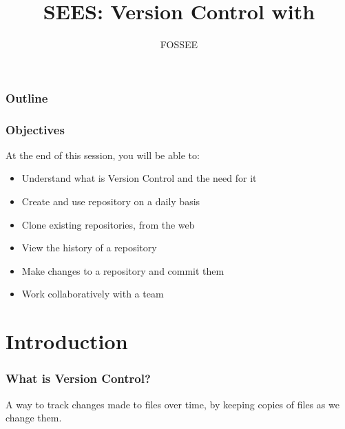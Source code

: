 \documentclass[14pt,compress]{beamer}
\title[Mercurial]{SEES: Version Control with \typ{hg}}
\author[FOSSEE] {FOSSEE}
\institute[IIT Bombay] {Department of Aerospace Engineering\\IIT Bombay}
\date[]{}
\newcounter{time}
\begin{document}
\begin{frame}
  \maketitle
\end{frame}

\begin{frame}
  \frametitle{Outline}
  \tableofcontents
\end{frame}

\begin{frame}
  \frametitle{Objectives}
  At the end of this session, you will be able to:
  \begin{itemize}
  \item Understand what is Version Control and the need for it
  \item Create and use repository on a daily basis
  \item Clone existing repositories, from the web
  \item View the history of a repository 
  \item Make changes to a repository and commit them
  \item Work collaboratively with a team 
  \end{itemize}
\end{frame}


\section{Introduction}

\begin{frame}
  \frametitle{What is Version Control?}
  \begin{block}{}
    A way to track changes made to files over time, by keeping copies
    of files as we change them.
  \end{block}
\end{frame}
\end{document}

